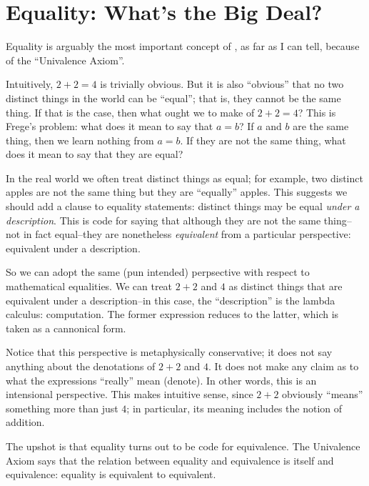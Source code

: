 \chapter{Equality: What's the Big Deal?}
\label{chap:equality}

\begin{ednote}
  Equality is arguably the most important concept of \HoTT{}, as far
  as I can tell, because of the ``Univalence Axiom''.
\end{ednote}

\begin{ednote}
  Intuitively, \(2+2=4\) is trivially obvious.  But it is also
  ``obvious'' that no two distinct things in the world can be
  ``equal''; that is, they cannot be the same thing.  If that is the
  case, then what ought we to make of \(2+2=4\)?  This is Frege's
  problem: what does it mean to say that \(a=b\)?  If \(a\) and \(b\)
  are the same thing, then we learn nothing from \(a=b\).  If they are
  not the same thing, what does it mean to say that they are equal?

  In the real world we often treat distinct things as equal; for
  example, two distinct apples are not the same thing but they are
  ``equally'' apples.  This suggests we should add a clause to
  equality statements: distinct things may be equal \emph{under a
    description}.  This is code for saying that although they are not
  the same thing--not in fact equal--they are nonetheless
  \emph{equivalent} from a particular perspective: equivalent under a
  description.

  So we can adopt the same (pun intended) perpsective with respect to
  mathematical equalities.  We can treat \(2+2\) and \(4\) as distinct
  things that are equivalent under a description--in this case, the
  ``description'' is the lambda calculus: computation.  The former
  expression reduces to the latter, which is taken as a cannonical
  form.

  Notice that this perspective is metaphysically conservative; it does
  not say anything about the denotations of \(2+2\) and \(4\).  It
  does not make any claim as to what the expressions ``really'' mean
  (denote).  In other words, this is an intensional perspective.  This
  makes intuitive sense, since \(2+2\) obviously ``means'' something
  more than just \(4\); in particular, its meaning includes the notion
  of addition.

  The upshot is that equality turns out to be code for equivalence.
  The Univalence Axiom says that the relation between equality and
  equivalence is itself and equivalence: equality is equivalent to
  equivalent.
\end{ednote}

